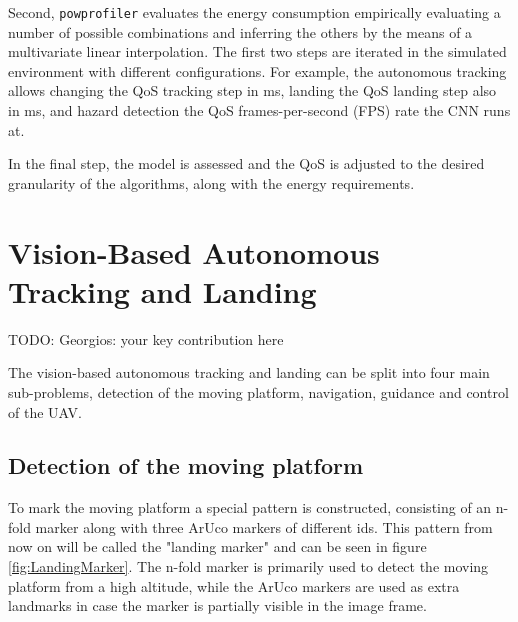 \documentclass[conference]{IEEEtran}
\newcommand{\stt}[1]{{\small\tt #1}} %
\newcommand{\powprof}{\stt{powprofiler}}
\begin{document}
Second, \powprof{} evaluates the energy consumption empirically evaluating a number of possible combinations and inferring the others by the means of a multivariate linear interpolation. The first two steps are iterated in the simulated environment with different configurations. 
For example, the autonomous tracking allows changing the QoS tracking step in ms, landing the QoS landing step also in ms, and hazard detection the QoS frames-per-second (FPS) rate the CNN runs at.

In the final step, the model is assessed and the QoS is adjusted to the desired granularity of the algorithms, along with the energy requirements.

\section{Vision-Based Autonomous Tracking and Landing}
\label{sec:landing}

TODO: Georgios: your key contribution here

The vision-based autonomous tracking and landing can be split into four main sub-problems, detection of the moving platform, navigation, guidance and control of the UAV.  


\subsection{Detection of the moving platform}
\label{sec:Detection}
To mark the moving platform a special pattern is constructed, consisting of an n-fold marker \cite{NfoldMarker} along with three ArUco markers \cite{ArUco_marker} of different ids. This pattern from now on will be called the "landing marker" and can be seen in figure \ref{fig:LandingMarker}. The n-fold marker is primarily used to detect the moving platform from a high altitude, while the ArUco markers are used as extra landmarks in case the marker is partially visible in the image frame. 
\end{document}
